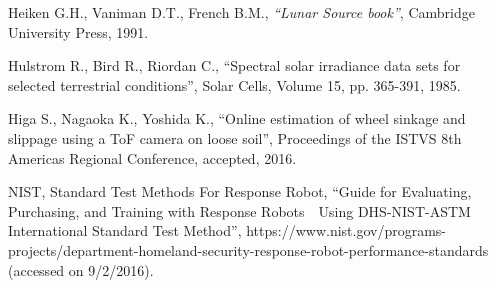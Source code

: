 \begin{thebibliography}{99}
{	
		Heiken G.H., Vaniman D.T., French B.M., 
			{\it ``Lunar Source book''}, 
				Cambridge University Press, 1991.	
	
		Hulstrom R., Bird R., Riordan C., 
			``Spectral solar irradiance data sets for selected terrestrial conditions'', 
				Solar Cells, Volume 15, pp. 365-391, 1985.

		Higa S., Nagaoka K., Yoshida K., 
			``Online estimation of wheel sinkage and slippage using a ToF camera on loose soil'', 
			 Proceedings of the ISTVS 8th Americas Regional Conference, accepted, 2016.

		NIST, Standard Test Methods For Response Robot, ``Guide for Evaluating, Purchasing, and Training with Response Robots　Using DHS-NIST-ASTM International Standard Test Method'', https://www.nist.gov/programs-projects/department-homeland-security-response-robot-performance-standards (accessed on 9/2/2016).
		


}
\end{thebibliography}

